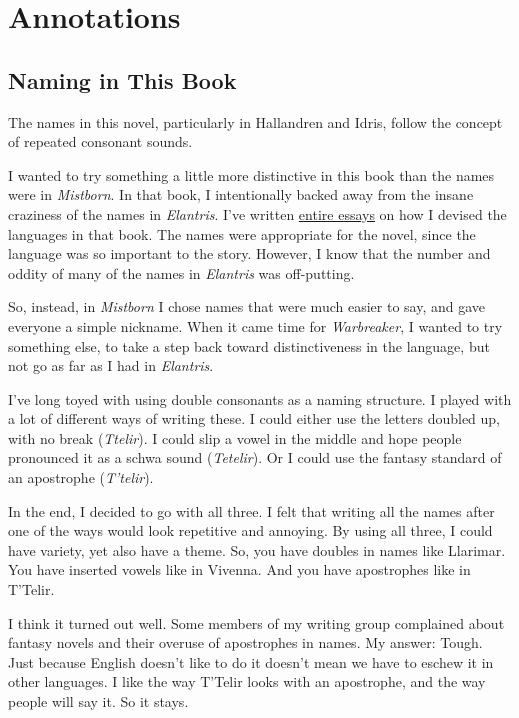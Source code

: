 \section*{Annotations}

\subsection*{Naming in This Book}

The names in this novel, particularly in Hallandren and Idris, follow the concept of repeated consonant sounds.

I wanted to try something a little more distinctive in this book than the names were in \textit{Mistborn}. In that book, I intentionally backed away from the insane craziness of the names in \textit{Elantris}. I've written \href{https://brandonsanderson.com/creating-the-languages-of-elantris/}{entire essays} on how I devised the languages in that book. The names were appropriate for the novel, since the language was so important to the story. However, I know that the number and oddity of many of the names in \textit{Elantris} was off-putting.

So, instead, in \textit{Mistborn} I chose names that were much easier to say, and gave everyone a simple nickname. When it came time for \textit{Warbreaker}, I wanted to try something else, to take a step back toward distinctiveness in the language, but not go as far as I had in \textit{Elantris}.

I’ve long toyed with using double consonants as a naming structure. I played with a lot of different ways of writing these. I could either use the letters doubled up, with no break (\textit{Ttelir}). I could slip a vowel in the middle and hope people pronounced it as a schwa sound (\textit{Tetelir}). Or I could use the fantasy standard of an apostrophe (\textit{T’telir}).

In the end, I decided to go with all three. I felt that writing all the names after one of the ways would look repetitive and annoying. By using all three, I could have variety, yet also have a theme. So, you have doubles in names like Llarimar. You have inserted vowels like in Vivenna. And you have apostrophes like in T’Telir.

I think it turned out well. Some members of my writing group complained about fantasy novels and their overuse of apostrophes in names. My answer: Tough. Just because English doesn’t like to do it doesn’t mean we have to eschew it in other languages. I like the way T’Telir looks with an apostrophe, and the way people will say it. So it stays.

